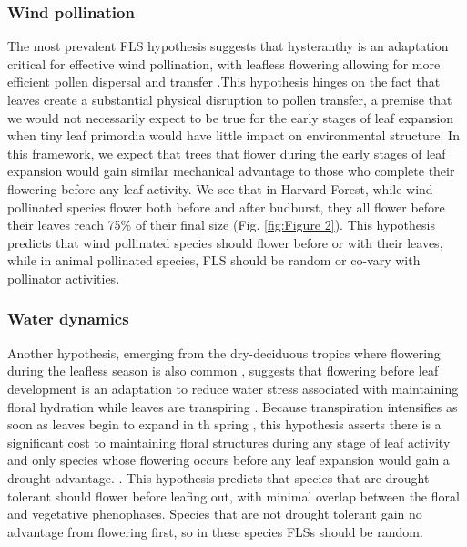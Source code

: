 \documentclass[12pt]{article}
\begin{document}
\subsubsection*{ Wind pollination}
\indent\indent The most prevalent FLS hypothesis suggests that hysteranthy is an adaptation critical for effective wind pollination, with leafless flowering allowing for more efficient pollen dispersal and transfer \citep{Whitehead1969, Spurr1980,Friedman2009}.This hypothesis hinges on the fact that leaves create a substantial physical disruption to pollen transfer, a premise that we would not necessarily expect to be true for the early stages of leaf expansion when tiny leaf primordia would have little impact on environmental structure. In this framework, we expect that trees that flower during the early stages of leaf expansion would gain similar mechanical advantage to those who complete their flowering before any leaf activity. We see that in Harvard Forest, while wind-pollinated species flower both before and after budburst, they all flower before their leaves reach 75\% of their final size (Fig. \ref{fig:Figure 2}). This hypothesis predicts that wind pollinated species should flower before or with their leaves, while in animal pollinated species, FLS should be random or co-vary with pollinator activities. %

\subsubsection*{Water dynamics}
\indent\indent Another hypothesis, emerging from the dry-deciduous tropics where flowering during the leafless season is also common \citep{Janzen1967}, suggests that flowering before leaf development is an adaptation to reduce water stress associated with maintaining floral hydration while leaves are transpiring \citep{Franklin2016}. Because transpiration intensifies as soon as leaves begin to expand in th spring \citep{Breda1996,Wang2018}, this hypothesis asserts there is a significant cost to maintaining floral structures during any stage of leaf activity and only species whose flowering occurs before any leaf expansion would gain a drought advantage.
. This hypothesis predicts that species that are drought tolerant should flower before leafing out, with minimal overlap between the floral and vegetative phenophases. Species that are not drought tolerant gain no advantage from flowering first, so in these species FLSs should be random.
\end{document}
